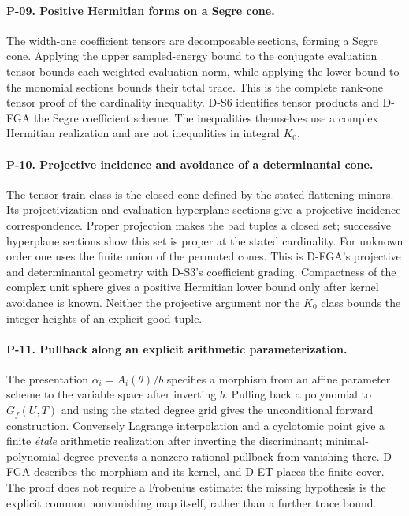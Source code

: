 \paragraph{P-09. Positive Hermitian forms on a Segre cone.}
The width-one coefficient tensors are decomposable sections, forming a Segre cone. Applying the upper sampled-energy bound to the conjugate evaluation tensor bounds each weighted evaluation norm, while applying the lower bound to the monomial sections bounds their total trace. This is the complete rank-one tensor proof of the cardinality inequality. D-S6 identifies tensor products and D-FGA the Segre coefficient scheme. The inequalities themselves use a complex Hermitian realization and are not inequalities in integral $K_0$.

\paragraph{P-10. Projective incidence and avoidance of a determinantal cone.}
The tensor-train class is the closed cone defined by the stated flattening minors. Its projectivization and evaluation hyperplane sections give a projective incidence correspondence. Proper projection makes the bad tuples a closed set; successive hyperplane sections show this set is proper at the stated cardinality. For unknown order one uses the finite union of the permuted cones. This is D-FGA's projective and determinantal geometry with D-S3's coefficient grading. Compactness of the complex unit sphere gives a positive Hermitian lower bound only after kernel avoidance is known. Neither the projective argument nor the $K_0$ class bounds the integer heights of an explicit good tuple.

\paragraph{P-11. Pullback along an explicit arithmetic parameterization.}
The presentation $\alpha_i=A_i(\theta)/b$ specifies a morphism from an affine parameter scheme to the variable space after inverting $b$. Pulling back a polynomial to $G_f(U,T)$ and using the stated degree grid gives the unconditional forward construction. Conversely Lagrange interpolation and a cyclotomic point give a finite \emph{\'etale} arithmetic realization after inverting the discriminant; minimal-polynomial degree prevents a nonzero rational pullback from vanishing there. D-FGA describes the morphism and its kernel, and D-ET places the finite cover. The proof does not require a Frobenius estimate: the missing hypothesis is the explicit common nonvanishing map itself, rather than a further trace bound.

